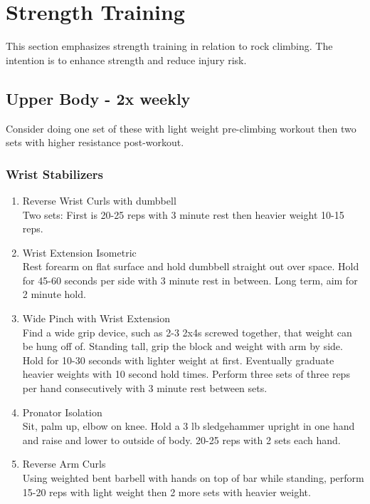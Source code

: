 \documentclass[12pt, letterpaper]{article}
\begin{document}
\newpage %


\section{Strength Training}

This section emphasizes strength training in relation to rock climbing.
The intention is to enhance strength and reduce injury risk. 

\subsection{Upper Body - 2x weekly}
Consider doing one set of these with light weight pre-climbing workout then two sets with higher resistance post-workout.

\subsubsection{Wrist Stabilizers}

\begin{enumerate}
    \item Reverse Wrist Curls with dumbbell \\ Two sets: First is 20-25 reps with 3 minute rest then heavier weight 10-15 reps.
    \item Wrist Extension Isometric \\ Rest forearm on flat surface and hold dumbbell straight out over space. Hold for 45-60 seconds per side with 3 minute rest in between. Long term, aim for 2 minute hold.
    \item Wide Pinch with Wrist Extension \\ Find a wide grip device, such as 2-3 2x4s screwed together, that weight can be hung off of. Standing tall, grip the block and weight with arm by side. Hold for 10-30 seconds with lighter weight at first. Eventually graduate heavier weights with 10 second hold times. Perform three sets of three reps per hand consecutively with 3 minute rest between sets.
    \item Pronator Isolation \\ Sit, palm up, elbow on knee. Hold a 3 lb sledgehammer upright in one hand and raise and lower to outside of body. 20-25 reps with 2 sets each hand.
    \item Reverse Arm Curls \\ Using weighted bent barbell with hands on top of bar while standing, perform 15-20 reps with light weight then 2 more sets with heavier weight.
\end{enumerate}
\end{document}
